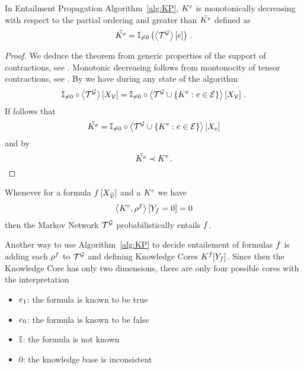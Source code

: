 \begin{theorem}
	In Entailment Propagation Algorithm~\ref{alg:KP}, $K^{e}$ is monotonically decreasing with respect to the partial ordering and greater than $\tilde{K^{e}}$ defined as
			\[ \tilde{K^{e}} = \mathbb{I}_{\neq0}\left(\left\langle \mathcal{T}^{\mathcal{G}}\right\rangle \left[ e \right]\right) \, . \]
\end{theorem}
\begin{proof}
	We deduce the theorem from generic properties of the support of contractions, see .
	Monotonic decreasing follows from montonocity of tensor contractions, see .
	By  we have during any state of the algorithm
		\[ \mathbb{I}_{\neq0}\circ\left\langle \mathcal{T}^{\mathcal{G}}\right\rangle \left[ X_{\mathcal{V}} \right]  =  
		\mathbb{I}_{\neq0}\circ\left\langle \mathcal{T}^{\mathcal{G}}\cup\{K^{e} : e\in\mathcal{E}\}\right\rangle \left[ X_{\mathcal{V}} \right]  \, . 
		\]
	If follows that
		\[ \tilde{K^{e}} =  \mathbb{I}_{\neq0}\circ\left\langle \mathcal{T}^{\mathcal{G}}\cup\{K^{e} : e\in\mathcal{E}\}\right\rangle \left[ X_{e} \right] \]
	and by 
		\[  \tilde{K^{e}}  \prec K^{e} \, . \]
\end{proof}


\begin{corollary}
	Whenever for a formula $f\left[X_{\tilde{\mathcal{V}}}\right]$ and a $K^{e}$ we have
		\[ \left\langle K^{e},\rho^{f}\right\rangle \left[ Y_{f}=0 \right] =0  \]
	then the Markov Network $\mathcal{T}^{\mathcal{G}}$ probabilistically entails $f$.
\end{corollary}


Another way to use Algorithm~\ref{alg:KP} to decide entailement of formulas $f$ is adding each $\rho^{f}$ to $\mathcal{T}^{\mathcal{G}}$ and defining Knowledge Cores $K^{f}[Y_{f}]$.
Since then the Knowledge Core has only two dimensions, there are only four possible cores with the interpretation
\begin{itemize}
	\item $e_1$: the formula is known to be true
	\item $e_0$: the formula is known to be false
	\item $\mathbb{I}$: the formula is not known
	\item $0$: the knowledge base is inconsistent
\end{itemize}


